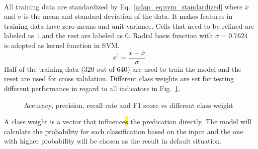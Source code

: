 \paragraph{}
All training data are standardized by Eq.~\ref{adap_eq:svm_standardized} where $\overline{x}$ and $\sigma$ is the mean and standard deviation of the data.
It makes features in training data have zero means and unit variance.
Cells that need to be refined are labeled as $1$ and the rest are labeled as $0$.
Radial basis function with $\sigma=0.7624$ is adopted as kernel function in SVM.
    \begin{equation}
        x^\prime = \frac{x-\overline{x}}{\sigma}
        \label{adap_eq:svm_standardized}
    \end{equation}
Half of the training data ($320$ out of $640$) are used to train the model and the reset are used for cross validation.
Different class weights are set for testing different performance in regard to all indicators in Fig.~\ref{adap_fig:svm_performance_0}.
\begin{figure}[h!]
    \centering
    \caption{Accuracy, precision, recall rate and F1 score vs different class weight}
    \label{adap_fig:svm_performance_0}
\end{figure}
%
A class weight is a vector that influence\hl{s} the predication directly.
The model will calculate the probability for each classification based on the input and the one with higher probability will be chosen as the result in default situation.
